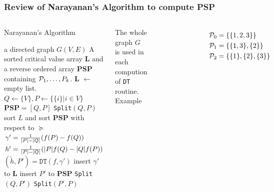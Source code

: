\documentclass[notheorems]{beamer}
\begin{document}
\begin{frame}
\frametitle{Review of Narayanan's Algorithm to compute PSP}
\begin{columns}
\begin{algorithm}[H]
\caption*{Narayanan's Algorithm}\label{alg:psp}
{\tiny
\begin{algorithmic}[1]
\REQUIRE a directed graph $G(V,E)$
\ENSURE A sorted critical value array \textbf{L} and a reverse ordered array \textbf{PSP} containing $\P_1,\dots, P_k$.
\STATE \textbf{L}  $\leftarrow$ empty list.
\STATE $Q\leftarrow \{V\}, P \leftarrow \{ \{i \} | i \in V\}$
\STATE $\mathbf{PSP}= [Q, P]$
\STATE \texttt{Split}$(Q,P)$
\STATE sort $L$ and sort $\mathbf{PSP}$ with respect to $\succeq$ 
 \STATE\label{alg:gamma} $\gamma' = {1 \over \abs{P} - \abs{Q}} (f(P)-f(Q))$
 \STATE $h' = {1 \over \abs{P} - \abs{Q}}(\abs{P} f(Q) - \abs{Q} f(P))$
 \STATE $(\tilde{h}, P') = \texttt{DT}(f,\gamma')$
 	\STATE insert $\gamma'$ to $\mathbf{L}$
 \ELSE
 	\STATE insert $P'$ to $\mathbf{PSP}$
 	\STATE \texttt{Split}$(Q, P')$
 	\STATE \texttt{Split}$(P',P)$
 \ENDIF
\ENDFUNCTION
\end{algorithmic}
}
\end{algorithm}
The whole graph $G$ is used in each compution of \texttt{DT} routine.
Example
\begin{figure}
\includegraphics[width=4.5cm]{pic/dt_with_graph.eps}
\end{figure}
\begin{align*}
\P_0  & = \{\{1,2,3\}\} \\
\P_1  & = \{\{1,3\},\{2\}\} \\
\P_2  & = \{\{1\},\{2\},\{3\}\} 
\end{align*}
\end{columns}
\end{frame}
\end{document}
